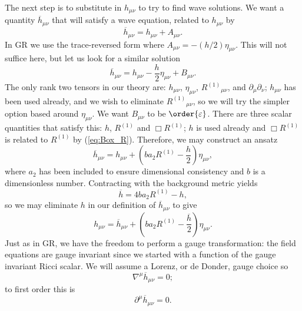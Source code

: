 \documentclass[aps,prd,reprint,showpacs]{revtex4-1}
\newcommand{\eqnref}[1]{(\ref{eq:#1})}
\begin{document}
The next step is to substitute in $h_{\mu\nu}$ to try to find wave solutions. We want a quantity $\overline{h}_{\mu\nu}$ that will satisfy a wave equation, related to $h_{\mu\nu}$ by
\begin{equation}
\overline{h}_{\mu\nu} = h_{\mu\nu} + A_{\mu\nu}.
\end{equation}
In GR we use the trace-reversed form where $A_{\mu\nu} = -(h/2)\eta_{\mu\nu}$. This will not suffice here, but let us look for a similar solution
\begin{equation}
\overline{h}_{\mu\nu} = h_{\mu\nu} - \frac{h}{2}\eta_{\mu\nu} + B_{\mu\nu}.
\end{equation}
The only rank two tensors in our theory are: $h_{\mu\nu}$, $\eta_{\mu\nu}$, ${R^{(1)}}_{\mu\nu}$, and $\partial_\mu\partial_\nu$; $h_{\mu\nu}$ has been used already, and we wish to eliminate ${R^{(1)}}_{\mu\nu}$, so we will try the simpler option based around $\eta_{\mu\nu}$. We want $B_{\mu\nu}$ to be $\order{\varepsilon}$. There are three scalar quantities that satisfy this: $h$, $R^{(1)}$ and $\Box R^{(1)}$; $h$ is used already and $\Box R^{(1)}$ is related to $R^{(1)}$ by \eqnref{Box_R}. Therefore, we may construct an ansatz
\begin{equation}
\overline{h}_{\mu\nu} = h_{\mu\nu} + \left(b a_2 R^{(1)} - \frac{h}{2}\right)\eta_{\mu\nu},
\label{eq:Ansatz}
\end{equation}
where $a_2$ has been included to ensure dimensional consistency and $b$ is a dimensionless number. Contracting with the background metric yields
\begin{equation}
\overline{h} = 4b a_2 R^{(1)} - h,
\label{eq:h_trace}
\end{equation}
so we may eliminate $h$ in our definition of $\overline{h}_{\mu\nu}$ to give
\begin{equation}
h_{\mu\nu} = \overline{h}_{\mu\nu} + \left(b a_2 R^{(1)} -\frac{\overline{h}}{2}\right)\eta_{\mu\nu}.
\end{equation}
Just as in GR, we have the freedom to perform a gauge transformation\cite{Misner1973, Hobson2006}: the field equations are gauge invariant since we started with a function of the gauge invariant Ricci scalar. We will assume a Lorenz, or de Donder, gauge choice so
\begin{equation}
\nabla^\mu \overline{h}_{\mu\nu} = 0;
\label{eq:Lorenz}
\end{equation}
to first order this is
\begin{equation}
\partial^\mu \overline{h}_{\mu\nu} = 0.
\end{equation}
\end{document}
